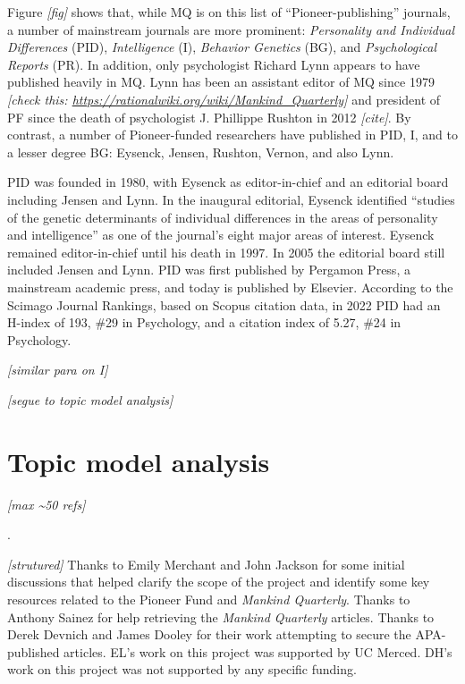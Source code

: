 \documentclass[12pt]{article}
\newcounter{lastnote}
\newenvironment{scilastnote}{%
\setcounter{lastnote}{\value{enumiv}}%
\addtocounter{lastnote}{+1}%
\begin{list}%
{\arabic{lastnote}.}
{\setlength{\leftmargin}{.22in}}
{\setlength{\labelsep}{.5em}}}
{\end{list}}
\begin{document}
Figure \emph{{[}fig{]}} shows that, while MQ is on this list of
``Pioneer-publishing'' journals, a number of mainstream journals are
more prominent: \emph{Personality and Individual Differences} (PID),
\emph{Intelligence} (I), \emph{Behavior Genetics} (BG), and
\emph{Psychological Reports} (PR). In addition, only psychologist
Richard Lynn appears to have published heavily in MQ. Lynn has been an
assistant editor of MQ since 1979 \emph{{[}check this:
\url{https://rationalwiki.org/wiki/Mankind_Quarterly}{]}} and president
of PF since the death of psychologist J. Phillippe Rushton in 2012
\emph{{[}cite{]}}. By contrast, a number of Pioneer-funded researchers
have published in PID, I, and to a lesser degree BG: Eysenck, Jensen,
Rushton, Vernon, and also Lynn.

PID was founded in 1980, with Eysenck as editor-in-chief and an
editorial board including Jensen and Lynn. In the inaugural editorial,
Eysenck identified ``studies of the genetic determinants of individual
differences in the areas of personality and intelligence'' as one of the
journal's eight major areas of interest. Eysenck remained
editor-in-chief until his death in 1997. In 2005 the editorial board
still included Jensen and Lynn. PID was first published by Pergamon
Press, a mainstream academic press, and today is published by Elsevier.
According to the Scimago Journal Rankings, based on Scopus citation
data, in 2022 PID had an H-index of 193, \#29 in Psychology, and a
citation index of 5.27, \#24 in Psychology.

\emph{{[}similar para on I{]}}

\emph{{[}segue to topic model analysis{]}}

\hypertarget{topic-model-analysis}{%
\section*{Topic model analysis}\label{topic-model-analysis}}

\emph{{[}max \textasciitilde50 refs{]}}




\begin{scilastnote}
\item \emph{{[}strutured{]}} Thanks to Emily Merchant and John Jackson
for some initial discussions that helped clarify the scope of the
project and identify some key resources related to the Pioneer Fund and
\emph{Mankind Quarterly}. Thanks to Anthony Sainez for help retrieving
the \emph{Mankind Quarterly} articles. Thanks to Derek Devnich and James
Dooley for their work attempting to secure the APA-published articles.
EL's work on this project was supported by UC Merced. DH's work on this
project was not supported by any specific funding.
\end{scilastnote}
\end{document}
